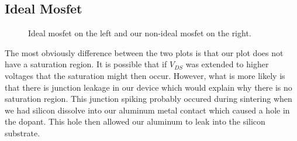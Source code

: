 \documentclass{article}
\begin{document}
\subsection{Ideal Mosfet}
\begin{figure}[H]
\centering
{}
\caption{Ideal mosfet on the left and our non-ideal mosfet on the right.}
\end{figure}
The most obviously difference between the two plots is that our plot does not have a saturation region. It is possible that if $V_{DS}$ was extended to higher voltages that the saturation might then occur. However, what is more likely is that there is junction leakage in our device which would explain why there is no saturation region. This junction spiking probably occured during sintering when we had silicon dissolve into our aluminum metal contact which caused a hole in the dopant. This hole then allowed our aluminum to leak into the silicon substrate.
\end{document}
